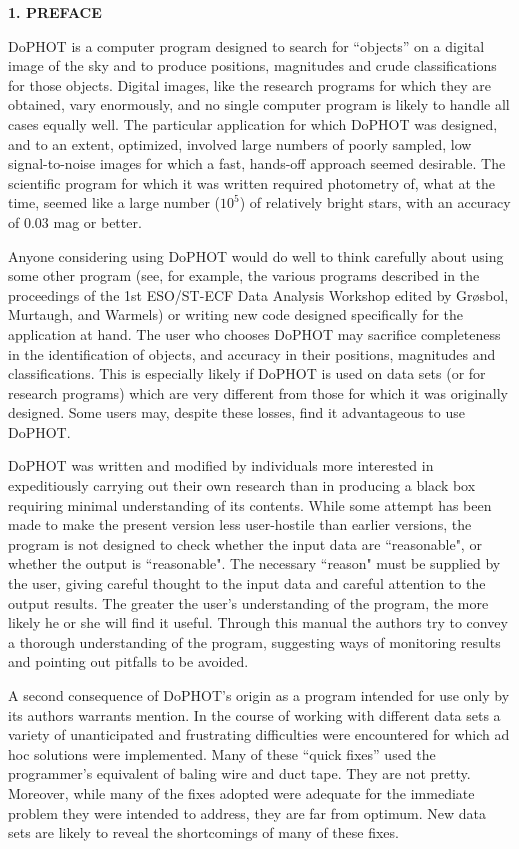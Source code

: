 \centerline{\bf 1. PREFACE}

DoPHOT is a computer program designed to search for
``objects'' on a digital image of the sky and to produce
positions, magnitudes and crude classifications for those
objects.  Digital images, like the research programs for
which they are obtained, vary enormously, and no single
computer program is likely to handle all cases equally well.
The particular application for which DoPHOT was designed,
and to an extent, optimized, involved large numbers of
poorly sampled, low signal-to-noise images for which a fast,
hands-off approach seemed desirable.  The scientific program
for which it was written required photometry of, what at the time,
seemed like a large
number ($10^5$) of relatively bright stars, with an accuracy
of 0.03 mag or better.

Anyone considering using DoPHOT would do well to think
carefully about using some other program (see, for example, the
various programs described in the proceedings of the 1st ESO/ST-ECF
Data Analysis Workshop edited by Gr\o sbol, Murtaugh, and Warmels)
or writing new code designed
specifically for the application at hand.  The user who
chooses DoPHOT may sacrifice completeness in the
identification of objects, and accuracy in their positions,
magnitudes and classifications.  This is especially likely
if DoPHOT is used on data sets (or for research programs)
which are very different from those for which it was
originally designed.  Some users may, despite these losses,
find it advantageous to use DoPHOT.

DoPHOT was written and modified by individuals more
interested in expeditiously carrying out their own research
than in producing a black box requiring minimal
understanding of its contents.  While some attempt has been
made to make the present version less user-hostile than
earlier versions, the program is not designed to check
whether the input data are ``reasonable", or whether the
output is ``reasonable".  The necessary ``reason" must be
supplied by the user, giving careful thought to the input
data and careful attention to the output results.  The
greater the user's understanding of the program, the more
likely he or she will find it useful.  Through this manual
the authors try to convey a thorough understanding of the
program, suggesting ways of monitoring results and pointing
out pitfalls to be avoided.

A second consequence of DoPHOT's origin as a program
intended for use only by its authors warrants mention.  In
the course of working with different data sets a variety of
unanticipated and frustrating difficulties were encountered
for which ad hoc solutions were implemented.  Many of these
``quick fixes'' used the programmer's equivalent of baling
wire and duct tape.  They are not pretty.  Moreover, while
many of the fixes adopted were adequate for the immediate
problem they were intended to address, they are far from
optimum.  New data sets are likely to reveal the
shortcomings of many of these fixes.


